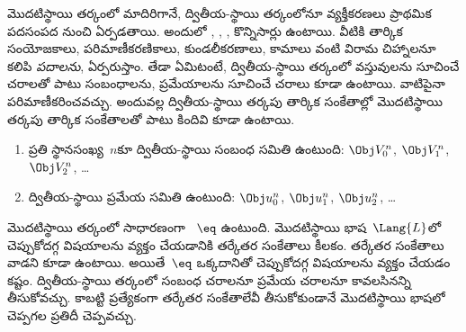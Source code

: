 \documentclass[../../../include/open-logic-section]{subfiles}
\begin{document}


మొదటిస్థాయి తర్కంలో మాదిరిగానే, ద్వితీయ-స్థాయి తర్కంలోనూ వ్యక్తీకరణలు ప్రాథమిక పదసంపద నుంచి ఏర్పడతాయి. అందులో \emph{}, \emph{}, \emph{}, కొన్నిసార్లు \emph{} ఉంటాయి. వీటికి తార్కిక సంయోజకాలు, పరిమాణీకరణికాలు, కుండలీకరణాలు, కామాలు వంటి విరామ చిహ్నాలనూ కలిపి \emph{పదాలను}, \emph{} ఏర్పరుస్తాం. తేడా ఏమిటంటే, ద్వితీయ-స్థాయి తర్కంలో వస్తువులను సూచించే చరాలతో పాటు సంబంధాలను, ప్రమేయాలను సూచించే చరాలు కూడా ఉంటాయి. వాటిపైనా పరిమాణీకరించవచ్చు. అందువల్ల ద్వితీయ-స్థాయి తర్కపు తార్కిక సంకేతాల్లో మొదటిస్థాయి తర్కపు తార్కిక సంకేతాలతో పాటు కిందివి కూడా ఉంటాయి.

\begin{enumerate}
  \item ప్రతి స్థానసంఖ్య~$n$కూ  ద్వితీయ-స్థాయి సంబంధ  సమితి ఉంటుంది: $\Obj V_0^n$, $\Obj V_1^n$, $\Obj V_2^n$, \dots
  \item {} ద్వితీయ-స్థాయి ప్రమేయ  సమితి ఉంటుంది: $\Obj u_0^n$, $\Obj u_1^n$, $\Obj u_2^n$, \dots
\end{enumerate}

మొదటిస్థాయి తర్కంలో సాధారణంగా ~$\eq$ ఉంటుంది. మొదటిస్థాయి భాష~$\Lang{L}$లో చెప్పుకోదగ్గ విషయాలను వ్యక్తం చేయడానికి తర్కేతర సంకేతాలు కీలకం. తర్కేతర సంకేతాలు వాడని  కూడా ఉంటాయి. అయితే~$\eq$ ఒక్కదానితో చెప్పుకోదగ్గ విషయాలను వ్యక్తం చేయడం కష్టం. ద్వితీయ-స్థాయి తర్కంలో సంబంధ చరాలనూ ప్రమేయ చరాలనూ కావలసినన్ని తీసుకోవచ్చు. కాబట్టి ప్రత్యేకంగా తర్కేతర సంకేతాలేవీ తీసుకోకుండానే మొదటిస్థాయి భాషలో చెప్పగల ప్రతిదీ చెప్పవచ్చు.
\end{document}
